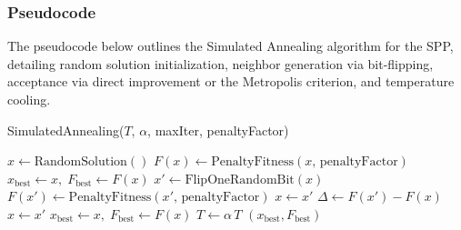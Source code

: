 \documentclass[12pt]{article}
\begin{document}
\subsubsection{Pseudocode}
The pseudocode below outlines the Simulated Annealing algorithm for the SPP, detailing random solution initialization, neighbor generation via bit-flipping, acceptance via direct improvement or the Metropolis criterion, and temperature cooling.
\begin{algorithm}[htbp]
  \caption{SimulatedAnnealing(\(T\), \(\alpha\), maxIter, penaltyFactor)}
  \begin{algorithmic}[1]
    \State \(x \gets \text{RandomSolution}()\) 
    \State \(F(x) \gets \text{PenaltyFitness}(x,\,\text{penaltyFactor})\)
    \State \(x_{\text{best}} \gets x,\; F_{\text{best}} \gets F(x)\)
      \State \(x' \gets \text{FlipOneRandomBit}(x)\) 
      \State \(F(x') \gets \text{PenaltyFitness}(x',\,\text{penaltyFactor})\)
        \State \(x \gets x'\) 
      \Else
        \State \(\Delta \gets F(x') - F(x)\)
          \State \(x \gets x'\) 
        \EndIf
      \EndIf
        \State \(x_{\text{best}} \gets x,\; F_{\text{best}} \gets F(x)\) 
      \EndIf
      \State \(T \gets \alpha \, T\) 
    \EndFor
    \State \Return \((x_{\text{best}}, F_{\text{best}})\)
  \end{algorithmic}
  \end{algorithm}
\end{document}
